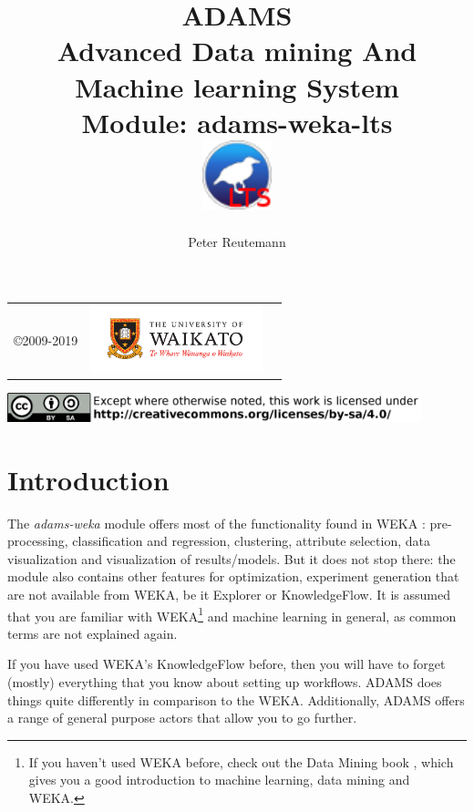 \documentclass[a4paper]{book}
\title{
  \textbf{ADAMS} \\
  {\Large \textbf{A}dvanced \textbf{D}ata mining \textbf{A}nd \textbf{M}achine
  learning \textbf{S}ystem} \\
  {\Large Module: adams-weka-lts} \\
  \vspace{1cm}
  \includegraphics[width=2cm]{images/weka-lts-module.png} \\
}
\author{
  Peter Reutemann
}
\begin{document}
\begin{titlepage}
\maketitle

\thispagestyle{empty}
\center
\begin{table}[b]
	\begin{tabular}{c l l}
		\parbox[c][2cm]{2cm}{\copyright 2009-2019} &
		\parbox[c][2cm]{5cm}{\includegraphics[width=5cm]{images/coat_of_arms.pdf}} \\
	\end{tabular}
	\includegraphics[width=12cm]{images/cc.png} \\
\end{table}

\end{titlepage}

\tableofcontents
\listoffigures

\chapter{Introduction}
The \textit{adams-weka} module offers most of the functionality found in WEKA
\cite{weka}: pre-processing, classification and regression, clustering,
attribute selection, data visualization and visualization of results/models.
But it does not stop there: the module also contains other features for
optimization, experiment generation that are not available from WEKA, be it
Explorer or KnowledgeFlow. It is assumed that you are familiar with
WEKA\footnote{If you haven't used WEKA before, check out the Data Mining book
\cite{wekabook}, which gives you a good introduction to machine learning, data
mining and WEKA.} and machine learning in general, as common terms are not
explained again.

If you have used WEKA's KnowledgeFlow before, then you will have to forget
(mostly) everything that you know about setting up workflows. ADAMS does things
quite differently in comparison to the WEKA. Additionally, ADAMS offers a range
of general purpose actors that allow you to go further.
\end{document}
